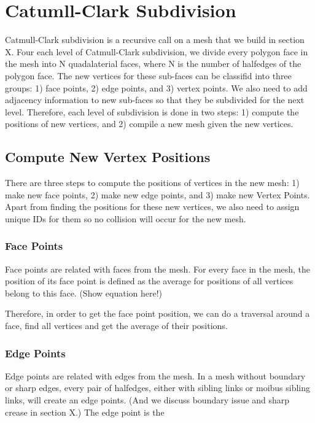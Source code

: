 \documentclass[12pt]{article}
\begin{document}
\section{Catumll-Clark Subdivision} \label{sec:ccsd}

Catmull-Clark subdivision is a recursive call on a mesh that we build in section X. Four each level of Catmull-Clark subdivision, we divide every polygon face in the mesh into N quadalaterial faces, where N is the number of halfedges of the polygon face. The new vertices for these sub-faces can be classifid into three groups: 1) face points, 2) edge points, and 3) vertex points. We also need to add adjacency information to new sub-faces so that they be subdivided for the next level. Therefore, each level of subdivision is done in two steps: 1) compute the positions of new vertices, and 2) compile a new mesh given the new vertices.

\subsection{Compute New Vertex Positions}
There are three steps to compute the positions of vertices in the new mesh: 1) make new face points, 2) make new edge points, and 3) make new Vertex Points. Apart from finding the positions for these new vertices, we also need to assign unique IDs for them so no collision will occur for the new mesh.

\subsubsection{Face Points}
Face points are related with faces from the mesh. For every face in the mesh, the position of its face point is defined as the average for positions of all vertices belong to this face. (Show equation here!)

Therefore, in order to get the face point position, we can do a traversal around a face, find all vertices and get the average of their positions.

\subsubsection{Edge Points}
Edge points are related with edges from the mesh. In a mesh without boundary or sharp edges, every pair of halfedges, either with sibling links or moibus sibling links, will create an edge points. (And we discuss boundary issue and sharp crease in section X.) The edge point is the  
\end{document}
